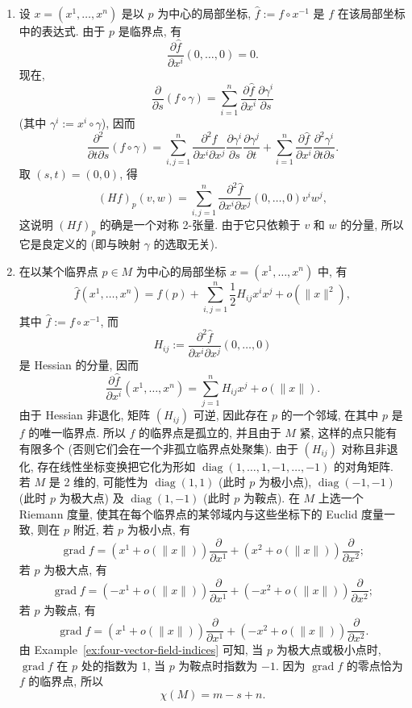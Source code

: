 \begin{description}[font=\normalfont,leftmargin=2em,labelwidth=1.5em]
\begin{enumerate}[label=(\alph*),ref=\alph*,leftmargin=*]
\item 设 $x=(x^1,\ldots,x^n)$ 是以 $p$ 为中心的局部坐标, $\widehat f:=f\circ x^{-1}$ 是 $f$ 在该局部坐标中的表达式. 由于 $p$ 是临界点, 有
\[
  \frac{\partial\widehat f}{\partial x^i}(0,\ldots,0)=0.
\]
现在,
\[
  \frac{\partial}{\partial s}(f\circ\gamma)
    =\sum_{i=1}^n\frac{\partial\widehat f}{\partial x^i}\frac{\partial\gamma^i}{\partial s}
\]
(其中 $\gamma^i:=x^i\circ\gamma$), 因而
\[
  \frac{\partial^2}{\partial t\partial s}(f\circ\gamma)
  =\sum_{i,j=1}^n\frac{\partial^2\widehat f}{\partial x^i\partial x^j}
     \frac{\partial\gamma^i}{\partial s}\frac{\partial\gamma^j}{\partial t}
  +\sum_{i=1}^n\frac{\partial\widehat f}{\partial x^i}\frac{\partial^2\gamma^i}{\partial t\partial s}.
\]
取 $(s,t)=(0,0)$, 得
\[
  (Hf)_p(v,w)=\sum_{i,j=1}^n\frac{\partial^2\widehat f}{\partial x^i\partial x^j}(0,\ldots,0)v^iw^j,
\]
这说明 $(Hf)_p$ 的确是一个对称 2-张量. 由于它只依赖于 $v$ 和 $w$ 的分量, 所以它是良定义的 (即与映射 $\gamma$ 的选取无关).
\item 在以某个临界点 $p\in M$ 为中心的局部坐标 $x=(x^1,\ldots,x^n)$ 中, 有
\[
  \widehat f(x^1,\ldots,x^n)=f(p)+\sum_{i,j=1}^n\frac12H_{ij}x^ix^j+o(\lVert x\rVert^2),
\]
其中 $\widehat f:=f\circ x^{-1}$, 而
\[
  H_{ij}:=\frac{\partial^2\widehat f}{\partial x^i\partial x^j}(0,\ldots,0)
\]
是 Hessian 的分量, 因而
\[
  \frac{\partial\widehat f}{\partial x^i}(x^1,\ldots,x^n)
    =\sum_{j=1}^nH_{ij}x^j+o(\lVert x\rVert).
\]
由于 Hessian 非退化, 矩阵 $(H_{ij})$ 可逆, 因此存在 $p$ 的一个邻域, 在其中 $p$ 是 $f$ 的唯一临界点. 所以 $f$ 的临界点是孤立的, 并且由于 $M$ 紧, 这样的点只能有有限多个 (否则它们会在一个非孤立临界点处聚集). 由于 $(H_{ij})$ 对称且非退化, 存在线性坐标变换把它化为形如 $\operatorname{diag}(1,\ldots,1,-1,\ldots,-1)$ 的对角矩阵. 若 $M$ 是 2 维的, 可能性为 $\operatorname{diag}(1,1)$ (此时 $p$ 为极小点), $\operatorname{diag}(-1,-1)$ (此时 $p$ 为极大点) 及 $\operatorname{diag}(1,-1)$ (此时 $p$ 为鞍点). 在 $M$ 上选一个 Riemann 度量, 使其在每个临界点的某邻域内与这些坐标下的 Euclid 度量一致, 则在 $p$ 附近, 若 $p$ 为极小点, 有
\[
  \operatorname{grad} f=(x^1+o(\lVert x\rVert))\frac{\partial}{\partial x^1}
                       +(x^2+o(\lVert x\rVert))\frac{\partial}{\partial x^2};
\]
若 $p$ 为极大点, 有
\[
  \operatorname{grad} f=(-x^1+o(\lVert x\rVert))\frac{\partial}{\partial x^1}
                       +(-x^2+o(\lVert x\rVert))\frac{\partial}{\partial x^2};
\]
若 $p$ 为鞍点, 有
\[
  \operatorname{grad} f=(x^1+o(\lVert x\rVert))\frac{\partial}{\partial x^1}
                       +(-x^2+o(\lVert x\rVert))\frac{\partial}{\partial x^2}.
\]
由 Example~\ref{ex:four-vector-field-indices} 可知, 当 $p$ 为极大点或极小点时, $\operatorname{grad} f$ 在 $p$ 处的指数为 1, 当 $p$ 为鞍点时指数为 $-1$. 因为 $\operatorname{grad} f$ 的零点恰为 $f$ 的临界点, 所以
\[
  \chi(M)=m-s+n.
\]
\end{enumerate}


\end{description}
